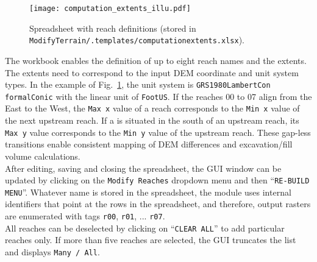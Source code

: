 \begin{figure}[hbt]
	\begin{center}
	\texttt{[image: computation\_extents\_illu.pdf]} %
	\caption{Spreadsheet with reach definitions (stored in \texttt{ModifyTerrain/.templates/computation{\myUnderscore}extents.xlsx}). \label{fig:computation_extents_illu}}
	\end{center}
\end{figure}

The workbook enables the definition of up to eight reach names and the extents. The extents need to correspond to the input DEM coordinate and unit system types. In the example of Fig.~\ref{fig:computation_extents_illu}, the unit system is \texttt{GRS{\myUnderscore}1980{\myUnderscore}Lambert{\myUnderscore}Con formal{\myUnderscore}Conic} with the linear unit of \texttt{Foot{\myUnderscore}US}. If the reaches 00 to 07 align from the East to the West, the \texttt{Max x} value of a reach corresponds to the \texttt{Min x} value of the next upstream reach. If a is situated in the south of an upstream reach, its \texttt{Max y} value corresponds to the \texttt{Min y} value of the upstream reach. These gap-less transitions enable consistent mapping of DEM differences and excavation/fill volume calculations.\\

After editing, saving and closing the spreadsheet, the GUI window can be updated by clicking on the \texttt{Modify Reaches} dropdown menu and then ``\texttt{RE-BUILD MENU}''. Whatever name is stored in the spreadsheet, the module uses internal identifiers that point at the rows in the spreadsheet, and therefore, output rasters are enumerated with tags \texttt{r00}, \texttt{r01}, ... \texttt{r07}.\\

All reaches can be deselected by clicking on ``\texttt{CLEAR ALL}'' to add particular reaches only. If more than five reaches are selected, the GUI truncates the list and displays \texttt{Many / All}.

